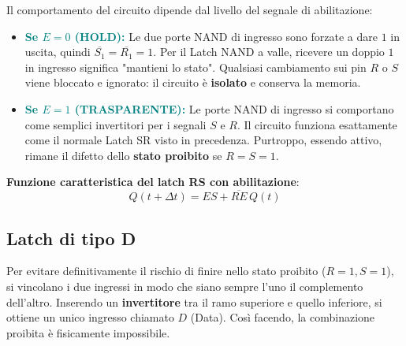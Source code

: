 Il comportamento del circuito dipende dal livello del segnale di abilitazione:
\begin{itemize}[leftmargin=1.5em,itemsep=4pt]
  \item \textcolor{teal}{\textbf{Se $E=0$ (HOLD):}} Le due porte NAND di ingresso sono forzate a dare $1$ in uscita, quindi $\overline{S_1}=\overline{R_1}=1$. Per il Latch NAND a valle, ricevere un doppio $1$ in ingresso significa "mantieni lo stato". Qualsiasi cambiamento sui pin $R$ o $S$ viene bloccato e ignorato: il circuito è \textbf{isolato} e conserva la memoria.
  \item \textcolor{teal}{\textbf{Se $E=1$ (TRASPARENTE):}} Le porte NAND di ingresso si comportano come semplici invertitori per i segnali $S$ e $R$. Il circuito funziona esattamente come il normale Latch SR visto in precedenza. Purtroppo, essendo attivo, rimane il difetto dello \textbf{stato proibito} se $R=S=1$.
\end{itemize}

\noindent\textbf{Funzione caratteristica del latch RS con abilitazione}:
\[
\boxed{Q(t+\Delta t) = ES + \overline{RE}\,Q(t)}
\]

\subsection{Latch di tipo D}

Per evitare definitivamente il rischio di finire nello stato proibito ($R=1, S=1$), si vincolano i due ingressi in modo che siano sempre l'uno il complemento dell'altro. Inserendo un \textbf{invertitore} tra il ramo superiore e quello inferiore, si ottiene un unico ingresso chiamato $D$ (Data). Così facendo, la combinazione proibita è fisicamente impossibile.

